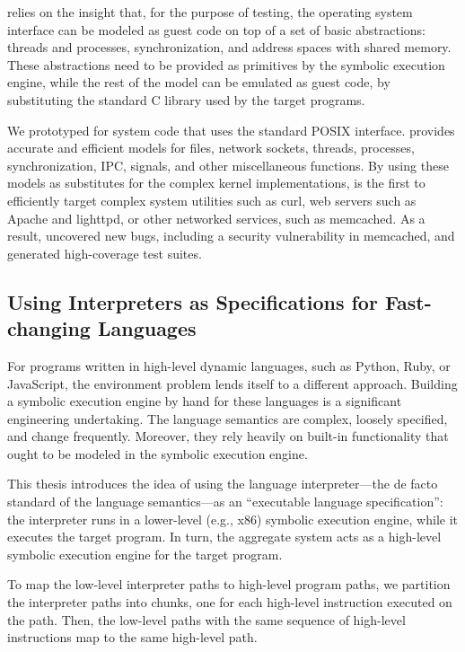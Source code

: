 \cnine relies on the insight that, for the purpose of testing, the operating system interface can be modeled as guest code on top of a set of basic abstractions: threads and processes, synchronization, and address spaces with shared memory.
%
These abstractions need to be provided as primitives by the symbolic execution engine, while the rest of the model can be emulated as guest code, by substituting the standard C library used by the target programs.

We prototyped \cnine for system code that uses the standard POSIX interface.  \cnine provides accurate and efficient models for files, network sockets, threads, processes, synchronization, IPC, signals, and other miscellaneous functions.
%
By using these models as substitutes for the complex kernel implementations, \cnine is the first to efficiently target complex system utilities such as \textsf{curl}, web servers such as Apache and lighttpd, or other networked services, such as memcached.
%
As a result, \cnine uncovered new bugs, including a security vulnerability in memcached, and generated high-coverage test suites.


\subsection{Using Interpreters as Specifications for Fast-changing Languages}

For programs written in high-level dynamic languages, such as Python, Ruby, or JavaScript, the environment problem lends itself to a different approach.
%
Building a symbolic execution engine by hand for these languages is a significant engineering undertaking.  The language semantics are complex, loosely specified, and change frequently.  Moreover, they rely heavily on built-in functionality that ought to be modeled in the symbolic execution engine.

This thesis introduces the idea of using the language interpreter---the de facto standard of the language semantics---as an ``executable language specification'': the interpreter runs in a lower-level (e.g., x86) symbolic execution engine, while it executes the target program.  In turn, the aggregate system acts as a high-level symbolic execution engine for the target program.

To map the low-level interpreter paths to high-level program paths, we partition the interpreter paths into chunks, one for each high-level instruction executed on the path. Then, the low-level paths with the same sequence of high-level instructions map to the same high-level path.

